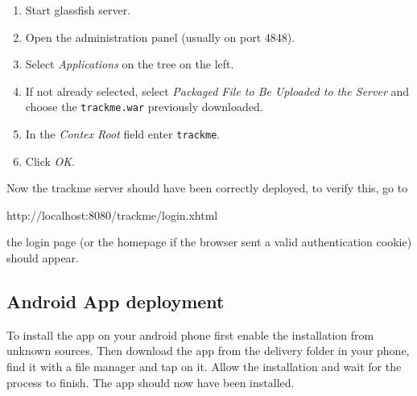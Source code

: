 \begin{enumerate}
\item Start glassfish server.
\item Open the administration panel (usually on port 4848).
\item Select \textit{Applications} on the tree on the left.
\item If not already selected, select \textit{Packaged File to Be Uploaded to the Server} and choose the \texttt{trackme.war} previously downloaded.
\item In the \textit{Contex Root} field enter \texttt{trackme}.
\item Click \textit{OK}.
\end{enumerate}
Now the trackme server should have been correctly deployed, to verify this, go to
\begin{center} http://localhost:8080/trackme/login.xhtml\end{center}
the login page (or the homepage if the browser sent a valid authentication cookie) should appear.

\subsection{Android App deployment}

To install the app on your android phone first enable the installation from unknown sources. Then download the app from the delivery folder in your phone, find it with a file manager and tap on it. Allow the installation and wait for the process to finish. The app should now have been installed.

